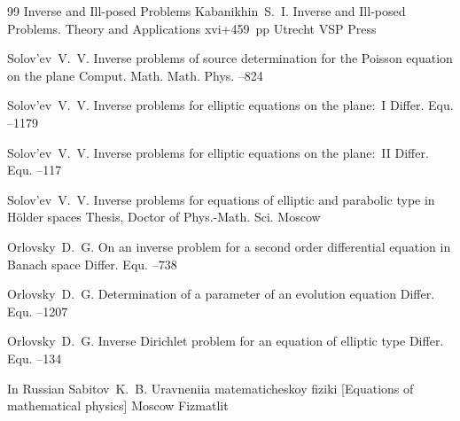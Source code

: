 \begin{thebibliography}{99}
\book Inverse and Ill-posed Problems
\by Kabanikhin~S.~I. 
\serial Inverse and Ill-posed Problems. Theory and Applications
\totalpages xvi+459~pp \nofrills
\publaddr Utrecht
\publ VSP Press

\by Solov'ev~V.~V.
\paper Inverse problems of source determination for the Poisson equation on the plane
\jour Comput. Math. Math. Phys.
--824

\by Solov'ev~V.~V.
\paper Inverse problems for elliptic equations on the plane:~I
\jour Differ. Equ.
--1179

\by Solov'ev~V.~V.
\paper Inverse problems for elliptic equations on the plane:~II
\jour Differ. Equ.
--117


\by Solov'ev~V.~V.
\thesis  Inverse problems for equations of elliptic and parabolic type in H\"older spaces
\thesisinfo  Thesis, Doctor of Phys.-Math. Sci. \nofrills
\publaddr Moscow

\by Orlovsky~D.~G.
\paper  On an inverse problem for a second order differential equation in Banach space
\jour Differ. Equ.
--738

\by Orlovsky~D.~G.
\paper Determination of a parameter of an evolution equation
\jour Differ. Equ.
--1207

\by Orlovsky~D.~G.
\paper Inverse Dirichlet problem for an equation of elliptic type
\jour Differ. Equ.
--134 

\lang In Russian
\by Sabitov~K.~B. 
\book Uravneniia matematicheskoy fiziki  \rm [Equations of mathematical physics]
\publaddr Moscow
\publ Fizmatlit


\end{thebibliography}



%
